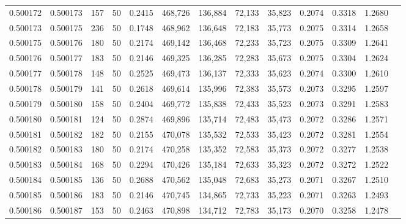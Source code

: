 \begin{tabular}{rrrrrrrrrrrrr}
0.500172 & 0.500173 & 157 &  50 &                                     0.2415 & 468,726 & 136,884 &  72,133 &  35,823 & 0.2074 & 0.3318 & 1.2680 \\
0.500173 & 0.500175 & 236 &  50 &                                     0.1748 & 468,962 & 136,648 &  72,183 &  35,773 & 0.2075 & 0.3314 & 1.2658 \\
0.500175 & 0.500176 & 180 &  50 &                                     0.2174 & 469,142 & 136,468 &  72,233 &  35,723 & 0.2075 & 0.3309 & 1.2641 \\
0.500176 & 0.500177 & 183 &  50 &                                     0.2146 & 469,325 & 136,285 &  72,283 &  35,673 & 0.2075 & 0.3304 & 1.2624 \\
0.500177 & 0.500178 & 148 &  50 &                                     0.2525 & 469,473 & 136,137 &  72,333 &  35,623 & 0.2074 & 0.3300 & 1.2610 \\
0.500178 & 0.500179 & 141 &  50 &                                     0.2618 & 469,614 & 135,996 &  72,383 &  35,573 & 0.2073 & 0.3295 & 1.2597 \\
0.500179 & 0.500180 & 158 &  50 &                                     0.2404 & 469,772 & 135,838 &  72,433 &  35,523 & 0.2073 & 0.3291 & 1.2583 \\
0.500180 & 0.500181 & 124 &  50 &                                     0.2874 & 469,896 & 135,714 &  72,483 &  35,473 & 0.2072 & 0.3286 & 1.2571 \\
0.500181 & 0.500182 & 182 &  50 &                                     0.2155 & 470,078 & 135,532 &  72,533 &  35,423 & 0.2072 & 0.3281 & 1.2554 \\
0.500182 & 0.500183 & 180 &  50 &                                     0.2174 & 470,258 & 135,352 &  72,583 &  35,373 & 0.2072 & 0.3277 & 1.2538 \\
0.500183 & 0.500184 & 168 &  50 &                                     0.2294 & 470,426 & 135,184 &  72,633 &  35,323 & 0.2072 & 0.3272 & 1.2522 \\
0.500184 & 0.500185 & 136 &  50 &                                     0.2688 & 470,562 & 135,048 &  72,683 &  35,273 & 0.2071 & 0.3267 & 1.2510 \\
0.500185 & 0.500186 & 183 &  50 &                                     0.2146 & 470,745 & 134,865 &  72,733 &  35,223 & 0.2071 & 0.3263 & 1.2493 \\
0.500186 & 0.500187 & 153 &  50 &                                     0.2463 & 470,898 & 134,712 &  72,783 &  35,173 & 0.2070 & 0.3258 & 1.2478 \\

\end{tabular}
